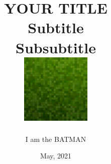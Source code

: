 \documentclass[a4paper,11pt]{book} 		%
\begin{document}
\title{\textbf{YOUR TITLE\\} \vspace{1cm} Subtitle\\Subsubtitle\\
\vspace{1cm}\includegraphics[width=0.25\textwidth]{cover.png}}
\author{I am the BATMAN}
\date{May, 2021}
\maketitle











\renewcommand{\listtablename}{Custom Table Index Name}  %
\renewcommand{\tablename}{Custom Table Name}            %
\tableofcontents
\listoffigures
\listoftables
\end{document}
